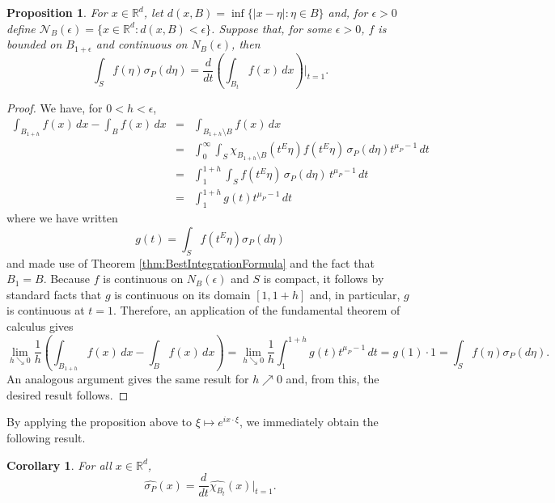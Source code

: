 \documentclass[11pt]{article}
\newtheorem{corollary}[theorem]{Corollary}
\newtheorem{proposition}[theorem]{Proposition}
\begin{document}
\begin{proposition}
For $x\in\mathbb{R}^d$, let $d(x,B)=\inf\{|x-\eta|:\eta\in B\}$ and, for $\epsilon>0$ define $\mathcal{N}_B(\epsilon)=\{x\in\mathbb{R}^d:d(x,B)<\epsilon\}$. Suppose that, for some $\epsilon>0$, $f$ is bounded on $B_{1+\epsilon}$ and continuous on $N_B(\epsilon)$, then
\begin{equation*}
    \int_{S}f(\eta)\sigma_P(d\eta)=\frac{d}{dt}\left(\int_{B_t}f(x)\,dx\right)\Big\vert_{t=1}.
\end{equation*}
\end{proposition}
\begin{proof}
We have, for $0<h<\epsilon$,
\begin{eqnarray*}
\int_{B_{1+h}}f(x)\,dx-\int_{B}f(x)\,dx &=& \int_{B_{1+h}\setminus B}f(x)\,dx\\
&=&\int_0^\infty \int_S \chi_{B_{1+h}\setminus B}(t^E\eta)f(t^E\eta)\,\sigma_P(d\eta)t^{\mu_P-1}\,dt\\
&=&\int_1^{1+h}\int_S f(t^E\eta)\,\sigma_P(d\eta)\,t^{\mu_P-1}\,dt\\
&=&\int_1^{1+h}g(t)t^{\mu_P-1}\,dt
\end{eqnarray*}
where we have written
\begin{equation*}
    g(t)=\int_S f(t^E\eta)\sigma_P(d\eta)
\end{equation*}
and made use of Theorem \ref{thm:BestIntegrationFormula} and the fact that $B_1=B$. Because $f$ is continuous on $N_B(\epsilon)$ and $S$ is compact, it follows by standard facts that $g$ is continuous on its domain $[1,1+h]$ and, in particular, $g$ is continuous at $t=1$. Therefore, an application of the fundamental theorem of calculus gives
\begin{equation*}
    \lim_{h\searrow 0}\frac{1}{h}\left(\int_{B_{1+h}}f(x)\,dx-\int_B f(x)\,dx\right) =\lim_{h\searrow 0}\frac{1}{h}\int_1^{1+h}g(t)t^{\mu_P-1}\,dt=g(1)\cdot 1=\int_S f(\eta)\sigma_P(d\eta).
\end{equation*}
An analogous argument gives the same result for $h\nearrow 0$ and, from this, the desired result follows.
\end{proof}

By applying the proposition above to $\xi\mapsto e^{ix\cdot\xi}$, we immediately obtain the following result.
\begin{corollary}
For all $x\in\mathbb{R}^d$,
\begin{equation*}
    \widehat{\sigma_P}(x)=\frac{d}{dt} \widehat{\chi_{B_t}}(x)\Big\vert_{t=1}.
\end{equation*}
\end{corollary}
\end{document}
